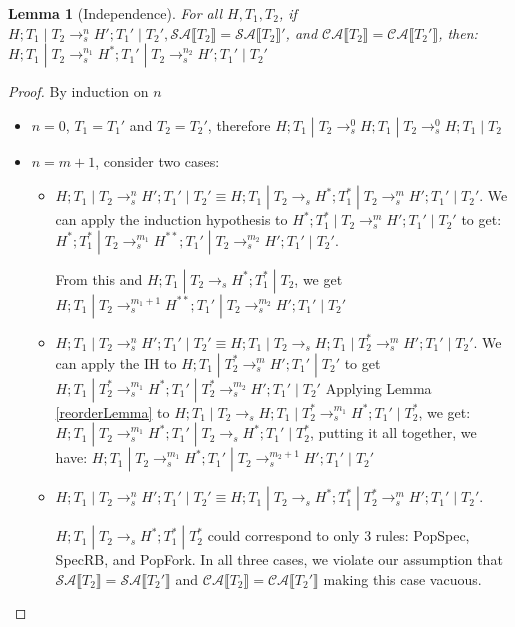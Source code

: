 \documentclass[9pt]{article}
\newtheorem{lemma}{Lemma}
\newcommand\specStep{\rightarrow_{s}}
\newcommand{\specActions}[1]{\mathcal{SA} \llbracket #1 \rrbracket}
\newcommand{\commitActions}[1]{\mathcal{CA} \llbracket #1 \rrbracket}
\begin{document}
\begin{lemma}[Independence]
\label{independence}
For all $H, T_1, T_2$, if $H; T_1 \; | \; T_2 \specStep^n H'; T_1' \; | \; T_2', \specActions{T_2} = \specActions{T_2}'$,  and $\commitActions{T_2} = \commitActions{T_2'}$, then: $H; T_1 \; | \; T_2 \specStep^{n_1} H^*; T_1' \; | \; T_2 \specStep^{n_2} H'; T_1' \; | \; T_2'$
\end{lemma}

\begin{proof}
By induction on $n$ 
\begin{itemize}
\item $n = 0$, $T_1 = T_1'$ and $T_2 = T_2'$, therefore $H; T_1 \; | \; T_2 \specStep^0 H; T_1 \; | \; T_2 \specStep^0 H; T_1 \; | \; T_2$

\item $n = m+1$, consider two cases:

\begin{itemize}

\item $H; T_1 \; | \; T_2 \specStep^n H'; T_1' \; | \; T_2' \equiv H; T_1 \; | \; T_2 \specStep H^*; T_1^* \; | \; T_2 \specStep^m H'; T_1' \; | \; T_2'$.  We can apply the induction hypothesis to $H^*; T_1^* \; | \; T_2 \specStep^m H'; T_1' \; | \; T_2'$ to get: $H^*; T_1^* \; | \; T_2 \specStep^{m_1} H^{**}; T_1' \; | \; T_2 \specStep^{m_2} H'; T_1' \; | \; T_2'$.  

From this and $H; T_1 \; | \; T_2 \specStep H^*; T_1^* \; | \; T_2$, we get $H; T_1 \; | \; T_2  \specStep^{m_1+1} H^{**}; T_1' \; | \; T_2 \specStep^{m_2} H'; T_1' \; | \; T_2'$

\item $H; T_1 \; | \; T_2 \specStep^n H'; T_1' \; | \; T_2' \equiv H; T_1 \; | \; T_2 \specStep H; T_1 \; | \; T_2^* \specStep^m H'; T_1' \; | \; T_2'$. We can apply the IH to $H; T_1 \; | \; T_2^* \specStep^m H'; T_1' \; | \; T_2'$ to get $H; T_1 \; | \; T_2^* \specStep^{m_1} H^*; T_1' \; | \; T_2^* \specStep^{m_2} H'; T_1' \; | \; T_2'$
Applying Lemma \ref{reorderLemma} to $H; T_1 \; | \; T_2 \specStep H; T_1 \; | \; T_2^* \specStep^{m_1} H^*; T_1' \; | \; T_2^*$, we get: $H; T_1 \; | \; T_2 \specStep^{m_1} H^*; T_1' \; | \; T_2 \specStep H^*; T_1' \; | \; T_2^*$, putting it all together, we have: $H; T_1 \; | \; T_2 \specStep^{m_1} H^*; T_1' \; | \; T_2 \specStep^{m_2+1} H'; T_1' \; | \; T_2'$

\item $H; T_1 \; | \; T_2 \specStep^n H'; T_1' \; | \; T_2' \equiv H; T_1 \; | \; T_2 \specStep H^*; T_1^* \; | \; T_2^* \specStep^m H'; T_1' \; | \; T_2'$.  

$H; T_1 \; | \; T_2 \specStep H^*; T_1^* \; | \; T_2^*$ could correspond to only 3 rules: PopSpec, SpecRB, and PopFork.  In all three cases, we violate our assumption that $\specActions{T_2} = \specActions{T_2'}$ and $\commitActions{T_2} = \commitActions{T_2'}$ making this case vacuous. 

\end{itemize}

\end{itemize}

\end{proof}
\end{document}
